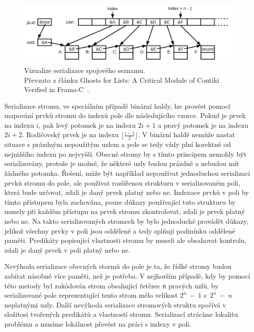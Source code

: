 \begin{figure}[H]
    \centering
    \includegraphics[width=\linewidth]{images/list-serialized}
    \caption{
        Vizualize serializace spojového seznamu. \\
        Převzato z článku Ghosts for Lists: A Critical Module of Contiki Verified in Frama\mbox{-}C~\cite{FCGhostsForLists}.
    }
    \label{fig:linked-list-serialization}
\end{figure}

Serializace stromu, ve speciálním případě binární haldy,
lze provést pomocí mapování prvků stromu do indexů pole dle následujícího vzorce.
Pokud je prvek na indexu $i$, pak levý potomek je na indexu $2i + 1$ a pravý potomek je na indexu $2i + 2$.
Rodičovský prvek je na indexu $\lfloor \frac{i - 1}{2} \rfloor$.
V binární haldě nemůže nastat situace s prázdným nepoužitým uzlem a pole se tedy vždy plní korektně
od nejnižšího indexu po nejvyšší.
Obecné stromy by s tímto principem nemohly být serializovány,
protože je možné, že některé uzly budou prázdné a nebudou mít žádného potomka.
Řešení, může být například nepoužívat jednoduchou serializaci prvků stromu do pole,
ale používat rozšířenou strukturu v serializovaném poli, která bude určovat,
zdali je daný prvek platný nebo ne.
Indexace prvků v poli by tímto přístupem byla zachována,
pouze důkazy používající tuto strukturu by musely při každém přístupu na prvek stromu
zkontrolovat, zdali je prvek platný nebo ne.
Na takto serializovaných stromech by bylo jednoduché provádět důkazy,
jelikož všechny prvky v poli jsou oddělené a tedy splňují podmínku oddělené paměti.
Predikáty popisující vlastnosti stromu by museli ale obsahovat kontrolu,
zdali je daný prvek v poli platný nebo ne.


Nevýhoda serializace obecných stormů do pole je ta, že řídké stromy budou zabírat
násobně více paměti, než je potřeba.
V nejhorším případě, kdy by pomocí této metody byl zakódován strom obsahující řetězec \texttt{n} pravých uzlů,
by serializované pole reprezentující tento strom mělo velikost $2^n~-~1$ s~$2^n~-~n$ neplatnými uzly.
Další nevýhoda serializace stromových struktu spočívá v složitosi
tvořených predikátů a vlastností stromu.
Serializací ztrácíme lokalitu problému a musíme lokálnost převést na práci s indexy v poli.


